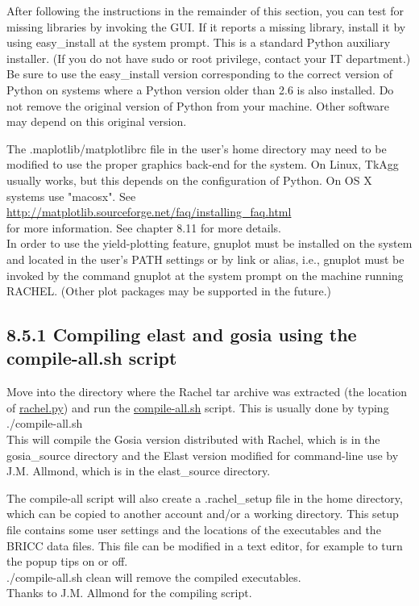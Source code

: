 \documentclass[10pt]{article}
\begin{document}
After following the instructions in the remainder of this section, you can test for missing libraries by invoking the GUI. If it reports a missing library, install it by using easy\_install at the system prompt. This is a standard Python auxiliary installer. (If you do not have sudo or root privilege, contact your IT department.) Be sure to use the easy\_install version corresponding to the correct version of Python on systems where a Python version older than 2.6 is also installed. Do not remove the original version of Python from your machine. Other software may depend on this original version.

The .maplotlib/matplotlibrc file in the user's home directory may need to be modified to use the proper graphics back-end for the system. On Linux, TkAgg usually works, but this depends on the configuration of Python. On OS X systems use "macosx". See\\
\href{http://matplotlib.sourceforge.net/faq/installing_faq.html}{http://matplotlib.sourceforge.net/faq/installing\_faq.html}\\
for more information. See chapter 8.11 for more details.\\
In order to use the yield-plotting feature, gnuplot must be installed on the system and located in the user's PATH settings or by link or alias, i.e., gnuplot must be invoked by the command gnuplot at the system prompt on the machine running RACHEL. (Other plot packages may be supported in the future.)

\subsection*{8.5.1 Compiling elast and gosia using the compile-all.sh script}
Move into the directory where the Rachel tar archive was extracted (the location of \href{http://rachel.py}{rachel.py}) and run the \href{http://compile-all.sh}{compile-all.sh} script. This is usually done by typing\\
./compile-all.sh\\
This will compile the Gosia version distributed with Rachel, which is in the gosia\_source directory and the Elast version modified for command-line use by J.M. Allmond, which is in the elast\_source directory.

The compile-all script will also create a .rachel\_setup file in the home directory, which can be copied to another account and/or a working directory. This setup file contains some user settings and the locations of the executables and the BRICC data files. This file can be modified in a text editor, for example to turn the popup tips on or off.\\
./compile-all.sh clean will remove the compiled executables.\\
Thanks to J.M. Allmond for the compiling script.
\end{document}
